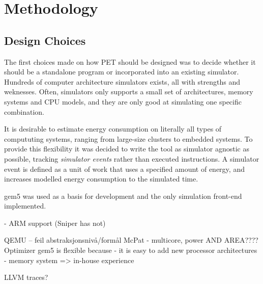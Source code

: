 \section{Methodology}

\subsection{Design Choices}
The first choices made on how PET should be designed was to decide whether it
should be a standalone program or incorporated into an existing simulator.
Hundreds of computer architecture simulators exists, all with strengths and
weknesses. Often, simulators only supports a small set of architectures, memory
systems and CPU models, and they are only good at simulating one specific
combination.

It is desirable to estimate energy consumption on literally all types of
compututing systems, ranging from large-size clusters to embedded systems. To
provide this flexibility it was decided to write the tool as simulator agnostic
as possible, tracking \emph{simulator events} rather than executed instructions.
A simulator event is defined as a unit of work that uses a specified amount of
energy, and increases modelled energy consumption to the simulated time.


gem5 was used as a basis for development and the only simulation front-end
implemented.




- ARM support (Sniper has not)

QEMU -- feil abstraksjonsnivå/formål
McPat - multicore, power AND AREA???? Optimizer
gem5 is flexible because
    - it is easy to add new processor architectures
    - memory system
=> in-house experience

LLVM traces?

